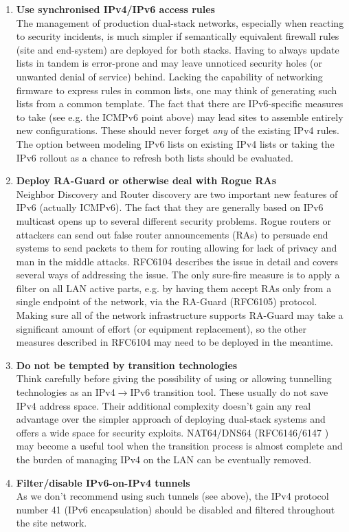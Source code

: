 \begin{enumerate}
\item {\bf Use synchronised IPv4/IPv6 access rules} \\
The management of production dual-stack networks, especially when reacting
to security incidents, is much simpler if semantically equivalent firewall rules
(site and end-system) are deployed for both stacks. Having to always
update lists in tandem is error-prone and may leave unnoticed security holes
(or unwanted denial of service) behind. Lacking the capability
of networking firmware to express rules in common lists, one may think
of generating such lists from a common template. The fact that there are
IPv6-specific measures to take (see e.g. the ICMPv6 point above) may lead
sites to assemble entirely new configurations. These should never forget {\it any}
of the existing IPv4 rules. The option between modeling IPv6 lists on
existing IPv4 lists or taking the IPv6 rollout as a chance to refresh
both lists should be evaluated.


\item {\bf Deploy RA-Guard or otherwise deal with Rogue RAs} \\
Neighbor Discovery and Router discovery are two important new features of IPv6
(actually ICMPv6).
The fact that they are generally based on IPv6 multicast opens up to several
different security problems. Rogue routers or attackers can send out false router
announcements (RAs) to persuade end systems to send packets to them
for routing allowing for lack of privacy and man in the middle attacks.
RFC6104 describes the issue in detail and covers 
several ways of addressing the issue. The only sure-fire measure is
to apply a filter on all LAN active parts, e.g. by having
them accept RAs only from a single endpoint of the network, 
via the RA-Guard (RFC6105) protocol. Making sure all of the network infrastructure
supports RA-Guard may take a significant amount of effort (or equipment
replacement), so the other measures described in RFC6104 may need to
be deployed in the meantime.


\item {\bf Do not be tempted by transition technologies} \\
Think carefully before giving the possibility of using or allowing 
tunnelling technologies as an IPv4$\rightarrow$IPv6 transition tool.
These usually do not save IPv4 address space. Their additional
complexity doesn't gain any real advantage over the simpler
approach of deploying dual-stack systems and offers a wide space
for security exploits. NAT64/DNS64 (RFC6146/6147 \cite{rfc}) may become
a useful tool when the transition process is almost complete and the burden
of managing IPv4 on the LAN can be eventually removed.

\item {\bf Filter/disable IPv6-on-IPv4 tunnels} \\
As we don't recommend using such tunnels (see above), the IPv4 protocol
number 41 (IPv6 encapsulation) should be disabled and filtered throughout
the site network.

\end{enumerate}



